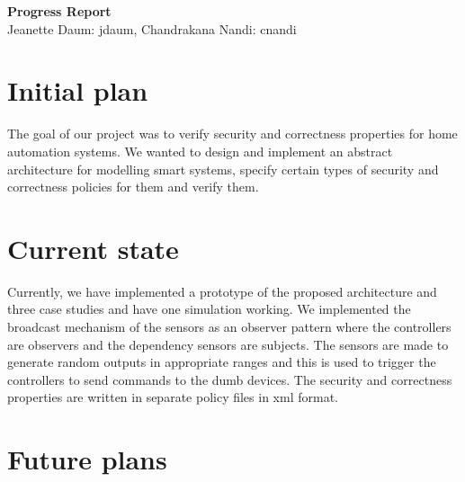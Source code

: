 \documentclass{article}
\begin{document}
\begin{center}
\large \textbf{Progress Report}\\
\normalsize {Jeanette Daum: jdaum, Chandrakana Nandi: cnandi}
\end{center}
\section{Initial plan}
The goal of our project was to verify security and correctness properties for home automation systems. We wanted to design and implement an abstract architecture for modelling smart systems, specify certain types of security and correctness policies for them and verify them. 

\section{Current state}
Currently, we have implemented a prototype of the proposed architecture and three case studies and have one simulation working. We implemented the broadcast mechanism of the sensors as an observer pattern where the controllers are observers and the dependency sensors are subjects. The sensors are made to generate random outputs in appropriate ranges and this is used to trigger the controllers to send commands to the dumb devices. The security and correctness properties are written in separate policy files in xml format. 
\section{Future plans}
\end{document}
